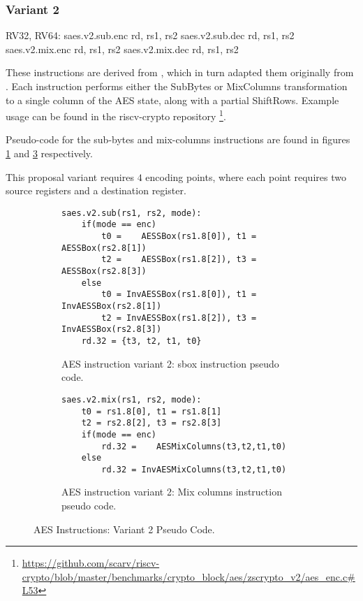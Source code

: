 
\subsubsection{Variant 2}

\begin{cryptoisa}
RV32, RV64:
    saes.v2.sub.enc    rd, rs1, rs2
    saes.v2.sub.dec    rd, rs1, rs2
    saes.v2.mix.enc    rd, rs1, rs2
    saes.v2.mix.dec    rd, rs1, rs2
\end{cryptoisa}

These instructions are derived from \cite{MPP:19}, which in turn adapted
them originally from \cite{TG:06}.
Each instruction performs either the SubBytes or MixColumns transformation
to a single column of the AES state, along with a partial ShiftRows.
Example usage can be found in the riscv-crypto repository
\footnote{\url{https://github.com/scarv/riscv-crypto/blob/master/benchmarks/crypto_block/aes/zscrypto_v2/aes_enc.c\#L53}}.

Pseudo-code for the sub-bytes and mix-columns instructions are found in
figures
\ref{fig:pesudo:aes:v2:sub}
and
\ref{fig:pesudo:aes:v2:mix}
respectively.

This proposal variant requires $4$ encoding points, where each point
requires two source registers and a destination register.

\begin{figure}
\begin{subfigure}[b]{1.0\textwidth}
\begin{lstlisting}
saes.v2.sub(rs1, rs2, mode):
    if(mode == enc)
        t0 =    AESSBox(rs1.8[0]), t1 =    AESSBox(rs2.8[1])
        t2 =    AESSBox(rs1.8[2]), t3 =    AESSBox(rs2.8[3])
    else
        t0 = InvAESSBox(rs1.8[0]), t1 = InvAESSBox(rs2.8[1])
        t2 = InvAESSBox(rs1.8[2]), t3 = InvAESSBox(rs2.8[3])
    rd.32 = {t3, t2, t1, t0} 
\end{lstlisting}
\caption{AES instruction variant 2: sbox instruction pseudo code.}
\label{fig:pesudo:aes:v2:sub}
\end{subfigure}
\begin{subfigure}[b]{1.0\textwidth}
\begin{lstlisting}
saes.v2.mix(rs1, rs2, mode):
    t0 = rs1.8[0], t1 = rs1.8[1]
    t2 = rs2.8[2], t3 = rs2.8[3]
    if(mode == enc)
        rd.32 =    AESMixColumns(t3,t2,t1,t0)
    else
        rd.32 = InvAESMixColumns(t3,t2,t1,t0)
\end{lstlisting}
\caption{AES instruction variant 2: Mix columns instruction pseudo code.}
\label{fig:pesudo:aes:v2:mix}
\end{subfigure}
\caption{AES Instructions: Variant 2 Pseudo Code.}
\end{figure}

